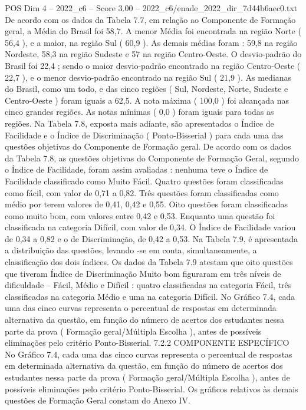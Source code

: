 \begin{textsample}{POS Dim 4 – 2022\_c6 – Score 3.00 – 2022\_c6/enade\_2022\_dir\_7d44b6aec0.txt}
De acordo com os dados da Tabela 7.7, em relação ao Componente de Formação geral, a Média do Brasil foi 58,7.
A menor Média foi encontrada na região Norte ( 56,4 ), e a maior, na região Sul ( 60,9 ).
As demais médias foram : 59,8 na região Nordeste, 58,3 na região Sudeste e 57 na região Centro-Oeste.
O desvio-padrão do Brasil foi 22,4 ; sendo o maior desvio-padrão encontrado na região Centro-Oeste ( 22,7 ), e o menor desvio-padrão encontrado na região Sul ( 21,9 ).
As medianas do Brasil, como um todo, e das cinco regiões ( Sul, Nordeste, Norte, Sudeste e Centro-Oeste ) foram iguais a 62,5.
A nota máxima ( 100,0 ) foi alcançada nas cinco grandes regiões.
As notas mínimas ( 0,0 ) foram iguais para todas as regiões.
Na Tabela 7.8, exposta mais adiante, são apresentados o Índice de Facilidade e o Índice de Discriminação ( Ponto-Bisserial ) para cada uma das questões objetivas do Componente de Formação geral.
De acordo com os dados da Tabela 7.8, as questões objetivas do Componente de Formação Geral, segundo o Índice de Facilidade, foram assim avaliadas : nenhuma teve o Índice de Facilidade classificado como Muito Fácil.
Quatro questões foram classificadas como fácil, com valor de 0,71 a 0,82.
Três questões foram classificadas como médio por terem valores de 0,41, 0,42 e 0,55.
Oito questões foram classificadas como muito bom, com valores entre 0,42 e 0,53.
Enquanto uma questão foi classificada na categoria Difícil, com valor de 0,34.
O Índice de Facilidade variou de 0,34 a 0,82 e o de Discriminação, de 0,42 a 0,53.
Na Tabela 7.9, é apresentada a distribuição das questões, levando -se em conta, simultaneamente, a classificação dos dois índices.
Os dados da Tabela 7.9 atestam que oito questões que tiveram Índice de Discriminação Muito bom figuraram em três níveis de dificuldade – Fácil, Médio e Difícil : quatro classificadas na categoria Fácil, três classificadas na categoria Médio e uma na categoria Difícil.
No Gráfico 7.4, cada uma das cinco curvas representa o percentual de respostas em determinada alternativa da questão, em função do número de acertos dos estudantes nessa parte da prova ( Formação geral/Múltipla Escolha ), antes de possíveis eliminações pelo critério Ponto-Bisserial. 7.2.2 COMPONENTE ESPECÍFICO No Gráfico 7.4, cada uma das cinco curvas representa o percentual de respostas em determinada alternativa da questão, em função do número de acertos dos estudantes nessa parte da prova ( Formação geral/Múltipla Escolha ), antes de possíveis eliminações pelo critério Ponto-Bisserial.
Os gráficos relativos às demais questões de Formação Geral constam do Anexo IV.

\end{textsample}

